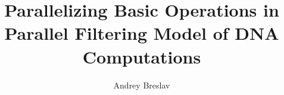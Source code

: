 \documentclass{article}
\begin{document}
\author{Andrey Breslav}
\title{Parallelizing Basic Operations in Parallel Filtering Model of DNA Computations}
\maketitle
\begin{abstract}

\end{abstract}
\thispagestyle{empty}

\pagestyle{plain}
\setcounter{page}{1}











\end{document}

